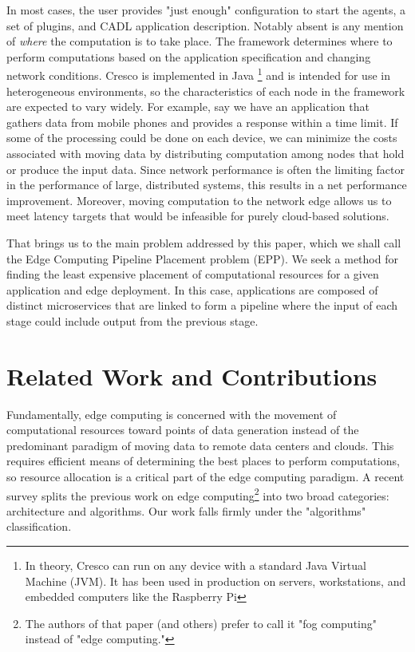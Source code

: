 \documentclass[conference]{IEEEtran}
\begin{document}
    In most cases, the user provides "just enough" configuration to start the agents, a set of plugins, and CADL application description. Notably absent is any mention of \textit{where} the computation is to take place. The framework determines where to perform computations based on the application specification and changing network conditions. Cresco is implemented in Java \footnote{In theory, Cresco can run on any device with a standard Java Virtual Machine (JVM). It has been used in production on servers, workstations, and embedded computers like the Raspberry Pi}
    and is intended for use in heterogeneous environments, so the characteristics of each node in the framework are expected to vary widely. For example, say we have an application that gathers data from mobile phones and provides a response within a time limit. If some of the processing could be done on each device, we can minimize the costs associated with moving data by distributing computation among nodes that hold or produce the input data. Since network performance is often the limiting factor in the performance of large, distributed systems, this results in a net performance improvement. Moreover, moving computation to the network edge allows us to meet latency targets that would be infeasible for purely cloud-based solutions.
    
    That brings us to the main problem addressed by this paper, which we shall call the Edge Computing Pipeline Placement problem (EPP).  We seek a method for finding the least expensive placement of computational resources for a given application and edge deployment. In this case, applications are composed of distinct microservices that are linked to form a pipeline where the input of each stage could include output from the previous stage.
    
    \section{Related Work and Contributions}
     Fundamentally, edge computing is concerned with the movement of computational resources toward points of data generation instead of the predominant paradigm of moving data to remote data centers and clouds. This requires efficient means of determining the best places to perform computations, so resource allocation is a critical part of the edge computing paradigm. A recent survey \cite{mouradian18} splits the previous work on edge computing\footnote{The authors of that paper (and others) prefer to call it "fog computing" instead of "edge computing."} into two broad categories: architecture and algorithms. Our work falls firmly under the "algorithms" classification.
    
\end{document}
